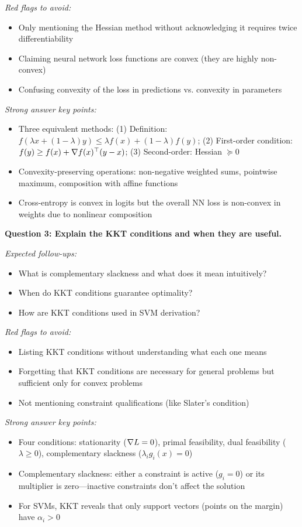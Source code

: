 \documentclass[../../main.tex]{subfiles}
\begin{document}
\begin{interviewquestions}
\textit{Red flags to avoid:}
\begin{itemize}
    \item Only mentioning the Hessian method without acknowledging it requires twice differentiability
    \item Claiming neural network loss functions are convex (they are highly non-convex)
    \item Confusing convexity of the loss in predictions vs. convexity in parameters
\end{itemize}

\textit{Strong answer key points:}
\begin{itemize}
    \item Three equivalent methods: (1) Definition: $f(\lambda x + (1-\lambda)y) \leq \lambda f(x) + (1-\lambda)f(y)$; (2) First-order condition: $f(y) \geq f(x) + \nabla f(x)^\top(y-x)$; (3) Second-order: Hessian $\succeq 0$
    \item Convexity-preserving operations: non-negative weighted sums, pointwise maximum, composition with affine functions
    \item Cross-entropy is convex in logits but the overall NN loss is non-convex in weights due to nonlinear composition
\end{itemize}

\vspace{0.5em}
\textbf{Question 3: Explain the KKT conditions and when they are useful.}

\textit{Expected follow-ups:}
\begin{itemize}
    \item What is complementary slackness and what does it mean intuitively?
    \item When do KKT conditions guarantee optimality?
    \item How are KKT conditions used in SVM derivation?
\end{itemize}

\textit{Red flags to avoid:}
\begin{itemize}
    \item Listing KKT conditions without understanding what each one means
    \item Forgetting that KKT conditions are necessary for general problems but sufficient only for convex problems
    \item Not mentioning constraint qualifications (like Slater's condition)
\end{itemize}

\textit{Strong answer key points:}
\begin{itemize}
    \item Four conditions: stationarity ($\nabla L = 0$), primal feasibility, dual feasibility ($\lambda \geq 0$), complementary slackness ($\lambda_i g_i(x) = 0$)
    \item Complementary slackness: either a constraint is active ($g_i = 0$) or its multiplier is zero---inactive constraints don't affect the solution
    \item For SVMs, KKT reveals that only support vectors (points on the margin) have $\alpha_i > 0$
\end{itemize}


\end{interviewquestions}
\end{document}
